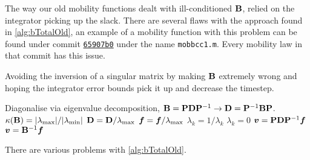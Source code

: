 The way our old mobility functions dealt with ill-conditioned $\mathbf{B}$, relied on the integrator picking up the slack. There are several flaws with the approach found in \cref{alg:bTotalOld}, an example of a mobility function with this problem can be found under commit \href{https://github.com/TarletonGroup/EasyDD/blob/65907b022d1fe408fc1b2e5c5ca2bd1797ccae04/mobbcc1.m#L68}{\texttt{65907b0}} under the name \texttt{mobbcc1.m}. Every mobility law in that commit has this issue.
\begin{algorithm}
    \caption[Bad way of avoiding drag matrix inversion singularity.]{Avoiding the inversion of a singular matrix by making $\mathbf{B}$ extremely wrong and hoping the integrator error bounds pick it up and decrease the timestep.}
    \label{alg:bTotalOld}
    \begin{algorithmic}
        \State Diagonalise via eigenvalue decomposition, $\mathbf{B} = \mathbf{P} \mathbf{D} \mathbf{P}^{-1} \to \mathbf{D} = \mathbf{P}^{-1} \mathbf{B} \mathbf{P}$.
        \State $\kappa(\mathbf{B}) = \lvert \lambda_{\textrm{max}} \rvert/ \lvert \lambda_{\textrm{min}} \rvert$
        \State $\mathbf{D} = \mathbf{D} / \lambda_{\textrm{max}}$
        \State $\vec{f} = \vec{f} / \lambda_{\rvar{max}}$
        \State $\lambda_k = 1/\lambda_k$
        \Else
        \State $\lambda_k = 0$
        \EndIf
        \EndFor
        \State $\vec{v} = \mtx{P} \mtx{D} \mtx{P}^{-1} \vec{f}$
        \Else
        \State $\vec{v} = \mtx{B}^{-1} \vec{f}$
        \EndIf
    \end{algorithmic}
\end{algorithm}
There are various problems with \cref{alg:bTotalOld}.

